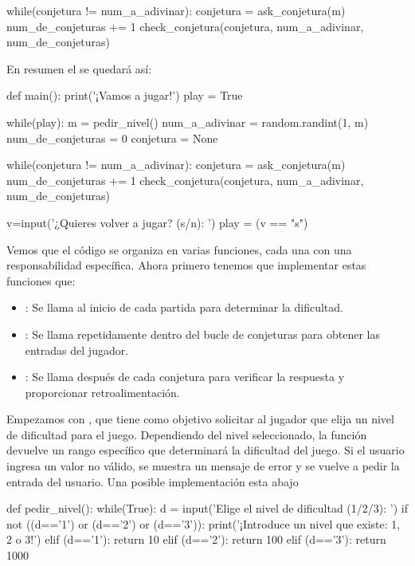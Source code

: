 \begin{python}
while(conjetura != num_a_adivinar):
    conjetura = ask_conjetura(m)
    num_de_conjeturas += 1
    check_conjetura(conjetura, num_a_adivinar, num_de_conjeturas)
\end{python}

En resumen el  se quedará así:

\begin{python}
def main():
    print('¡Vamos a jugar!')
    play = True
    
    while(play):
        m = pedir_nivel() 
        num_a_adivinar = random.randint(1, m)
        num_de_conjeturas = 0
        conjetura = None

        while(conjetura != num_a_adivinar):
            conjetura = ask_conjetura(m)
            num_de_conjeturas += 1
            check_conjetura(conjetura, num_a_adivinar, num_de_conjeturas)
            
        v=input('¿Quieres volver a jugar? (s/n): ')
        play = (v == "s")
\end{python}


Vemos que el código se organiza en varias funciones, cada una con una responsabilidad específica. Ahora primero tenemos que implementar estas funciones que:

\begin{itemize}
\item {}: Se llama al inicio de cada partida para determinar la dificultad.
\item {}: Se llama repetidamente dentro del bucle de conjeturas para obtener las entradas del jugador.
\item {}: Se llama después de cada conjetura para verificar la respuesta y proporcionar retroalimentación.
\end{itemize}

Empezamos con , que tiene como objetivo solicitar al jugador que elija un nivel de dificultad para el juego. Dependiendo del nivel seleccionado, la función devuelve un rango específico que determinará la dificultad del juego. Si el usuario ingresa un valor no válido, se muestra un mensaje de error y se vuelve a pedir la entrada del usuario. Una posible implementación esta abajo

\begin{python}
def pedir_nivel():
    while(True):
        d = input('Elige el nivel de dificultad (1/2/3): ')
        if not ((d=='1') or (d=='2') or (d=='3')):
            print('¡Introduce un nivel que existe: 1, 2 o 3!')
        elif (d=='1'):
            return 10
        elif (d=='2'):
            return 100
        elif (d=='3'):
            return 1000
\end{python}


